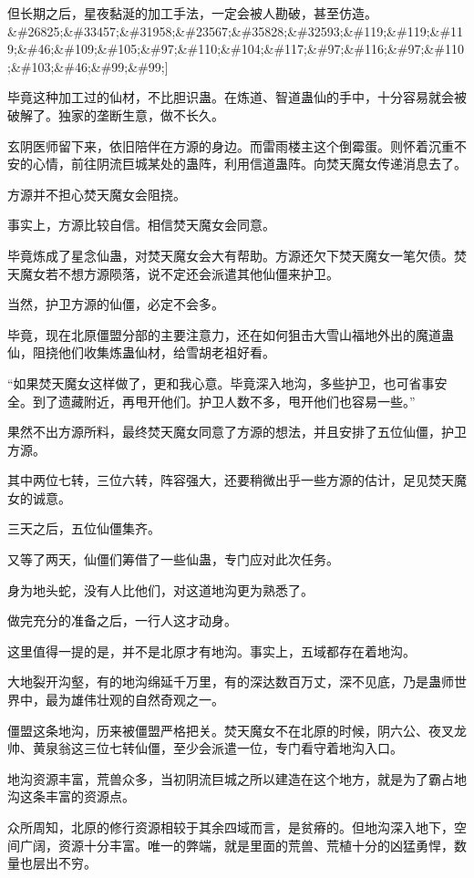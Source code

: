 \begin{this_body}
但长期之后，星夜黏涎的加工手法，一定会被人勘破，甚至仿造。\&\#26825;\&\#33457;\&\#31958;\&\#23567;\&\#35828;\&\#32593;\&\#119;\&\#119;\&\#119;\&\#46;\&\#109;\&\#105;\&\#97;\&\#110;\&\#104;\&\#117;\&\#97;\&\#116;\&\#97;\&\#110;\&\#103;\&\#46;\&\#99;\&\#99;]

毕竟这种加工过的仙材，不比胆识蛊。在炼道、智道蛊仙的手中，十分容易就会被破解了。独家的垄断生意，做不长久。

玄阴医师留下来，依旧陪伴在方源的身边。而雷雨楼主这个倒霉蛋。则怀着沉重不安的心情，前往阴流巨城某处的蛊阵，利用信道蛊阵。向焚天魔女传递消息去了。

方源并不担心焚天魔女会阻挠。

事实上，方源比较自信。相信焚天魔女会同意。

毕竟炼成了星念仙蛊，对焚天魔女会大有帮助。方源还欠下焚天魔女一笔欠债。焚天魔女若不想方源陨落，说不定还会派遣其他仙僵来护卫。

当然，护卫方源的仙僵，必定不会多。

毕竟，现在北原僵盟分部的主要注意力，还在如何狙击大雪山福地外出的魔道蛊仙，阻挠他们收集炼蛊仙材，给雪胡老祖好看。

“如果焚天魔女这样做了，更和我心意。毕竟深入地沟，多些护卫，也可省事安全。到了遗藏附近，再甩开他们。护卫人数不多，甩开他们也容易一些。”

果然不出方源所料，最终焚天魔女同意了方源的想法，并且安排了五位仙僵，护卫方源。

其中两位七转，三位六转，阵容强大，还要稍微出乎一些方源的估计，足见焚天魔女的诚意。

三天之后，五位仙僵集齐。

又等了两天，仙僵们筹借了一些仙蛊，专门应对此次任务。

身为地头蛇，没有人比他们，对这道地沟更为熟悉了。

做完充分的准备之后，一行人这才动身。

这里值得一提的是，并不是北原才有地沟。事实上，五域都存在着地沟。

大地裂开沟壑，有的地沟绵延千万里，有的深达数百万丈，深不见底，乃是蛊师世界中，最为雄伟壮观的自然奇观之一。

僵盟这条地沟，历来被僵盟严格把关。焚天魔女不在北原的时候，阴六公、夜叉龙帅、黄泉翁这三位七转仙僵，至少会派遣一位，专门看守着地沟入口。

地沟资源丰富，荒兽众多，当初阴流巨城之所以建造在这个地方，就是为了霸占地沟这条丰富的资源点。

众所周知，北原的修行资源相较于其余四域而言，是贫瘠的。但地沟深入地下，空间广阔，资源十分丰富。唯一的弊端，就是里面的荒兽、荒植十分的凶猛勇悍，数量也层出不穷。


\end{this_body}
